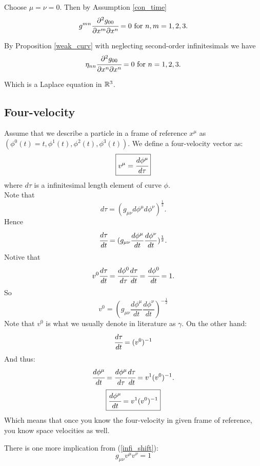 \documentclass[main.tex]{subfiles}
\begin{document}
Choose $\mu=\nu = 0$. Then by Assumption \ref{con_time}
$$
g^{mn} \cfrac{\partial^2 g_{00}}{\partial x^m \partial x^n} = 0 \text{ for } n,m=1,2,3.
$$

By Proposition \ref{weak_curv} with neglecting second-order infinitesimals we have
$$
\eta_{nn} \cfrac{\partial^2 g_{00}}{\partial x^n \partial x^n} = 0  \text{ for } n=1,2,3.
$$

Which is a Laplace equation in $\mathbb{R}^3$.
\subsection{Four-velocity}
Assume that we describe a particle in a frame of reference $x^\mu$ as $(\phi^0(t) = t, \phi^1(t), \phi^2(t), \phi^3(t)).$ We define a four-velocity vector as:
$$
\boxed{
v^\mu = \cfrac{d\phi^\mu}{d\tau}
}
$$
where $d\tau$ is a infinitesimal length element of curve $\phi$.\\

Note that 
\begin{equation}\label{infi_shift}
d\tau = (g_{\mu\nu}d\phi^\mu d\phi^\nu)^\frac{1}{2}.
\end{equation}
Hence
$$
\cfrac{d\tau}{dt} = (g_{\mu\nu}\frac{d\phi^\mu}{dt}\frac{d\phi^\nu}{dt})^\frac{1}{2}.
$$
Notive that
$$
v^0\cfrac{d\tau}{dt} = \cfrac{d\phi^0}{d\tau}\cfrac{d\tau}{dt} = \cfrac{d\phi^0}{dt} = 1.
$$
So
$$
\boxed
{
v^0 = (g_{\mu\nu}\frac{d\phi^\mu}{dt}\frac{d\phi^\nu}{dt})^{-\frac{1}{2}}
}
$$
Note that $v^0$ is what we usually denote in literature as $\gamma$.
On the other hand:
$$
\cfrac{d\tau}{dt} = (v^0)^{-1}
$$
And thus:
$$
\cfrac{d\phi^\mu}{dt} = \cfrac{d\phi^\mu}{d\tau}\cfrac{d\tau}{dt} = v^1(v^0)^{-1}. 
$$
$$
\boxed{
\cfrac{d\phi^\mu}{dt} = v^1(v^0)^{-1}
}
$$
Which means that once you know the four-velocity in given frame of reference, you know space velocities as well.

There is one more implication from (\ref{infi_shift}):
\begin{equation}\label{one}
\boxed{
g_{\mu\nu}v^\mu v^\nu = 1
}
\end{equation}
\end{document}
